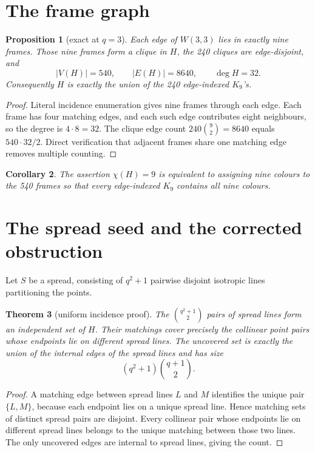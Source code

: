 \documentclass[11pt]{article}
\newtheorem{theorem}{Theorem}
\newtheorem{proposition}[theorem]{Proposition}
\newtheorem{corollary}[theorem]{Corollary}
\begin{document}
\section{The frame graph}
\begin{proposition}[exact at \(q=3\)]
Each edge of \(W(3,3)\) lies in exactly nine frames. Those nine frames form a
clique in \(H\), the 240 cliques are edge-disjoint, and
\[
 |V(H)|=540,\qquad |E(H)|=8640,\qquad \deg H=32.
\]
Consequently \(H\) is exactly the union of the 240 edge-indexed \(K_9\)'s.
\end{proposition}

\begin{proof}
Literal incidence enumeration gives nine frames through each edge. Each frame
has four matching edges, and each such edge contributes eight neighbours, so the
degree is \(4\cdot8=32\). The clique edge count
\(240\binom92=8640\) equals \(540\cdot32/2\). Direct verification that adjacent
frames share one matching edge removes multiple counting.
\end{proof}

\begin{corollary}
The assertion \(\chi(H)=9\) is equivalent to assigning nine colours to the 540
frames so that every edge-indexed \(K_9\) contains all nine colours.
\end{corollary}

\section{The spread seed and the corrected obstruction}
Let \(S\) be a spread, consisting of \(q^2+1\) pairwise disjoint isotropic lines
partitioning the points.

\begin{theorem}[uniform incidence proof]
The \(\binom{q^2+1}{2}\) pairs of spread lines form an independent set of \(H\).
Their matchings cover precisely the collinear point pairs whose endpoints lie on
different spread lines. The uncovered set is exactly the union of the internal
edges of the spread lines and has size
\[
 (q^2+1)\binom{q+1}{2}.
\]
\end{theorem}

\begin{proof}
A matching edge between spread lines \(L\) and \(M\) identifies the unique pair
\(\{L,M\}\), because each endpoint lies on a unique spread line. Hence matching
sets of distinct spread pairs are disjoint. Every collinear pair whose endpoints
lie on different spread lines belongs to the unique matching between those two
lines. The only uncovered edges are internal to spread lines, giving the count.
\end{proof}
\end{document}
